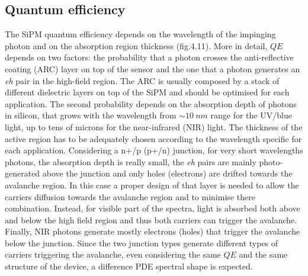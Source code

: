 \subsection*{Quantum efficiency}
The SiPM quantum efficiency depends on the wavelength of the impinging photon and on the absorption region thickness (fig.4.11). More in detail, $QE$ depends on two factors: the probability that a photon crosses the anti-reflective coating (ARC) layer on top of the sensor and the one that a photon generates an \textit{eh} pair in the high-field region. The ARC is usually composed by a stack of different dielectric layers on top of the SiPM and should be optimised for each application. The second probability depends on the absorption depth of photons in silicon, that grows with the wavelength from $\sim10\ nm$ range for the UV/blue light, up to tens of microns for the near-infrared (NIR) light. The thickness of the active region has to be adequately chosen according to the wavelength specific for each application.  Considering a n+/p (p+/n) junction, for very short wavelengths photons, the absorption depth is really small, the \textit{eh} pairs are mainly photo-generated above the junction and only holes (electrons) are drifted towards the avalanche region.
In this case a proper design of that layer is needed to allow the carriers diffusion towards the avalanche region and to minimise there combination.
Instead, for visible part of the spectra, light is absorbed both above and below the high field region and thus both carriers can trigger the avalanche. Finally, NIR photons generate mostly electrons (holes) that trigger the avalanche below the junction. Since the two junction types generate different types of carriers triggering the avalanche, even considering the same $QE$ and the same structure of the device, a difference PDE spectral shape is expected.\\


